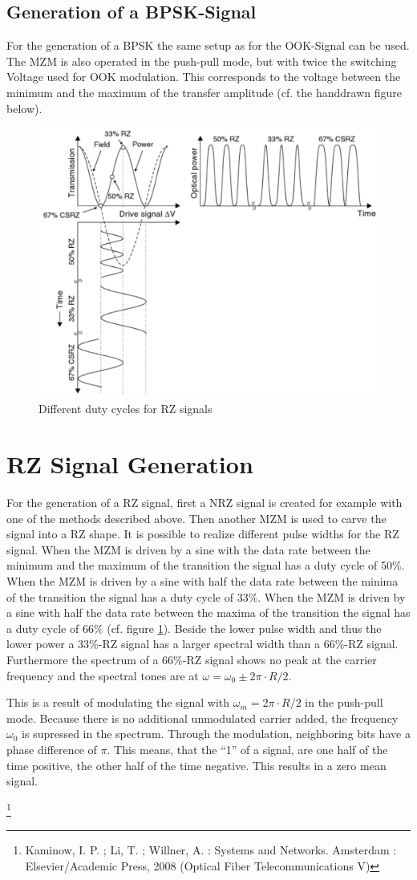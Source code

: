 \subsection{Generation of a BPSK-Signal}
For the generation of a BPSK the same setup as for the OOK-Signal can be used. The MZM is also operated in the push-pull mode, but with twice the switching Voltage used for OOK modulation. This corresponds to the voltage between the minimum and the maximum of the transfer amplitude (cf. the handdrawn figure below).\footnotemark[1]
\newpage
\begin{figure}
  \centering
  \includegraphics[width=.5\columnwidth]{Grafiken/RZ_OOK.jpg}
\caption{Different duty cycles for RZ signals}
\label{fig:RZ_OOK}
\end{figure}

\section{RZ Signal Generation}
\label{sec:RZ}
For the generation of a RZ signal, first a NRZ signal is created for example with one of the methods described above. Then another MZM is used to carve the signal into a RZ shape. It is possible to realize different pulse widths for the RZ signal. When the MZM is driven by a sine with the data rate between the minimum and the maximum of the transition the signal has a duty cycle of 50\%. When the MZM is driven by a sine with half the data rate between the minima of the transition the signal has a duty cycle of 33\%. When the MZM is driven by a sine with half the data rate between the maxima of the transition the signal has a duty cycle of 66\% (cf. figure \ref{fig:RZ_OOK}). Beside the lower pulse width and thus the lower power a 33\%-RZ signal has a larger spectral width than a 66\%-RZ signal. Furthermore the spectrum of a 66\%-RZ signal shows no peak at the carrier frequency and the spectral tones are at $\omega=\omega_0\pm2\pi\cdot R/2$.

This is a result of modulating the signal with $\omega_m=2\pi\cdot R/2$ in the push-pull mode. Because there is no additional unmodulated carrier added, the frequency $\omega_0$ is supressed in the spectrum. Through the modulation, neighboring bits have a phase difference of $\pi$. This means, that the "`1"' of a signal, are one half of the time positive, the other half of the time negative. This results in a zero mean signal. 






\footnote[2]{Kaminow, I. P. ; Li, T. ; Willner, A. : Systems and Networks. Amsterdam :
Elsevier/Academic Press, 2008 (Optical Fiber Telecommunications V)}

